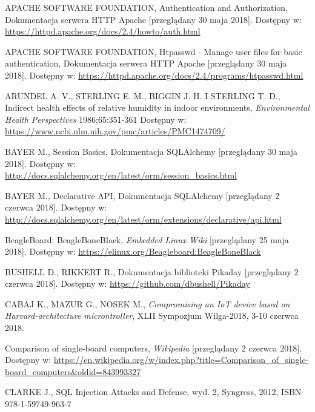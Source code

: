 \documentclass[a4paper,11pt,twoside]{article}
\begin{document}
\begin{thebibliography}{9}

\uppercase{Apache Software Foundation}, Authentication and Authorization, Dokumentacja serwera HTTP Apache [przeglądany 30 maja 2018].
Dostępny w: \url{https://httpd.apache.org/docs/2.4/howto/auth.html}

\uppercase{Apache Software Foundation}, Htpasswd - Manage user files for basic authentication, Dokumentacja serwera HTTP Apache [przeglądany 30 maja 2018].
Dostępny w: \url{https://httpd.apache.org/docs/2.4/programs/htpasswd.html}

\uppercase{Arundel A. V., Sterling E. M., Biggin J. H. i Sterling T. D.}, Indirect health effects of relative humidity in indoor environments, \textit{Environmental Health Perspectives} 1986;65:351-361
Dostępny w: \url{https://www.ncbi.nlm.nih.gov/pmc/articles/PMC1474709/}

\uppercase{Bayer M.}, Session Basics, Dokumentacja SQLAlchemy [przeglądany 30 maja 2018].
Dostępny w: \url{http://docs.sqlalchemy.org/en/latest/orm/session_basics.html}

\uppercase{Bayer M.}, Declarative API, Dokumentacja SQLAlchemy [przeglądany 2 czerwca 2018].
Dostępny w: \url{http://docs.sqlalchemy.org/en/latest/orm/extensions/declarative/api.html}

BeagleBoard: BeagleBoneBlack, \textit{Embedded Linux Wiki} [przeglądany 25 maja 2018].
Dostępny w: \url{https://elinux.org/Beagleboard:BeagleBoneBlack}

\uppercase{Bushell D., Rikkert R.}, Dokumentacja biblioteki Pikaday [przeglądany 2 czerwca 2018].
Dostępny w: \url{https://github.com/dbushell/Pikaday}

\uppercase{Cabaj K., Mazur G., Nosek M.}, \textit{Compromising an IoT device based on Harvard-architecture microntroller}, XLII Sympozjum Wilga-2018, 3-10 czerwca 2018.

Comparison of single-board computers, \textit{Wikipedia} [przeglądany 2 czerwca 2018].
Dostępny w: \url{https://en.wikipedia.org/w/index.php?title=Comparison_of_single-board_computers&oldid=843993327}

\uppercase{Clarke J.}, SQL Injection Attacks and Defense, wyd. 2, Syngress, 2012, ISBN 978-1-59749-963-7  


\end{thebibliography}
\end{document}
